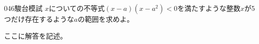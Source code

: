 \begin{thm}{046}{\maru}{駿台模試}
 $x$についての不等式$(x-a)(x-a^2)<0$を満たすような整数$x$が5つだけ存在するような$a$の範囲を求めよ。
\end{thm}

ここに解答を記述。